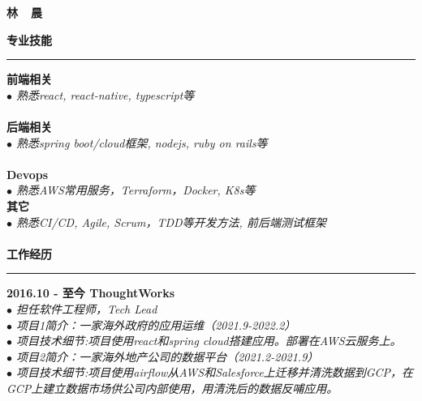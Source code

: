 \documentclass[a3paper,12pt,final]{memoir}
\newcommand{\myThemeColor}{RoyalBlue}
\newcommand{\SmallSep}{\vspace{0.9em}}
\newcommand{\CVSection}[1]
	{\Large\textbf{#1}\par
	\vspace{0.2cm}\normalsize\normalfont}
\newcommand{\CVItem}[1]
	{\textbf{\color{\myThemeColor} #1}}
\begin{document}
\begin{CJK*}{UTF8}{gbsn}
\begin{flushright}
	
\end{flushright}\normalsize
\framebreak


\Huge\bfseries {\color{\myThemeColor} 林~~晨}\\
\normalsize\normalfont


\CVSection{专业技能}
\hrule
\SmallSep
\CVItem{前端相关}\\
\textit{$\bullet$ 熟悉react, react-native, typescript等} \\
\\
\CVItem{后端相关}\\
\textit{$\bullet$ 熟悉spring boot/cloud框架, nodejs, ruby on rails等 } \\
\\
\CVItem{Devops}\\
\textit{$\bullet$ 熟悉AWS常用服务，Terraform，Docker, K8s等 }\\

\CVItem{其它}\\
\textit{$\bullet$ 熟悉CI/CD, Agile, Scrum，TDD等开发方法, 前后端测试框架 }\\
\\

\CVSection{工作经历}
\hrule
\SmallSep
\CVItem{2016.10 - 至今 \hfill ThoughtWorks}\\
\textit{$\bullet$ 担任软件工程师，Tech Lead} \\
\textit{$\bullet$ 项目1简介：一家海外政府的应用运维（2021.9-2022.2）} \\
\textit{$\bullet$ 项目技术细节:项目使用react和spring cloud搭建应用。部署在AWS云服务上。}\\


\textit{$\bullet$ 项目2简介：一家海外地产公司的数据平台（2021.2-2021.9）} \\
\textit{$\bullet$ 项目技术细节:项目使用airflow从AWS和Salesforce上迁移并清洗数据到GCP，在GCP上建立数据市场供公司内部使用，用清洗后的数据反哺应用。}\\



\end{CJK*}
\end{document}
